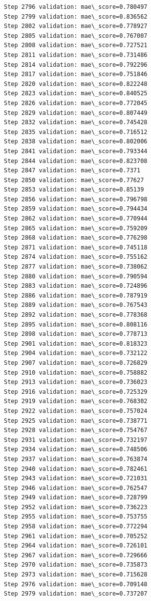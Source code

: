 \documentclass[11pt]{article}
\begin{document}
\begin{Verbatim}[commandchars=\\\{\}]
Step 2796 validation: mae\_score=0.780497
Step 2799 validation: mae\_score=0.836562
Step 2802 validation: mae\_score=0.778927
Step 2805 validation: mae\_score=0.767007
Step 2808 validation: mae\_score=0.727521
Step 2811 validation: mae\_score=0.731486
Step 2814 validation: mae\_score=0.792296
Step 2817 validation: mae\_score=0.751846
Step 2820 validation: mae\_score=0.822248
Step 2823 validation: mae\_score=0.840525
Step 2826 validation: mae\_score=0.772045
Step 2829 validation: mae\_score=0.807449
Step 2832 validation: mae\_score=0.745428
Step 2835 validation: mae\_score=0.716512
Step 2838 validation: mae\_score=0.802006
Step 2841 validation: mae\_score=0.793344
Step 2844 validation: mae\_score=0.823708
Step 2847 validation: mae\_score=0.7371
Step 2850 validation: mae\_score=0.77627
Step 2853 validation: mae\_score=0.85139
Step 2856 validation: mae\_score=0.796798
Step 2859 validation: mae\_score=0.794434
Step 2862 validation: mae\_score=0.770944
Step 2865 validation: mae\_score=0.759209
Step 2868 validation: mae\_score=0.776298
Step 2871 validation: mae\_score=0.745118
Step 2874 validation: mae\_score=0.755162
Step 2877 validation: mae\_score=0.738062
Step 2880 validation: mae\_score=0.790594
Step 2883 validation: mae\_score=0.724896
Step 2886 validation: mae\_score=0.787919
Step 2889 validation: mae\_score=0.767543
Step 2892 validation: mae\_score=0.778368
Step 2895 validation: mae\_score=0.808116
Step 2898 validation: mae\_score=0.778713
Step 2901 validation: mae\_score=0.818323
Step 2904 validation: mae\_score=0.732122
Step 2907 validation: mae\_score=0.726829
Step 2910 validation: mae\_score=0.758882
Step 2913 validation: mae\_score=0.736023
Step 2916 validation: mae\_score=0.725329
Step 2919 validation: mae\_score=0.768302
Step 2922 validation: mae\_score=0.757024
Step 2925 validation: mae\_score=0.738771
Step 2928 validation: mae\_score=0.754767
Step 2931 validation: mae\_score=0.732197
Step 2934 validation: mae\_score=0.748506
Step 2937 validation: mae\_score=0.763874
Step 2940 validation: mae\_score=0.782461
Step 2943 validation: mae\_score=0.721031
Step 2946 validation: mae\_score=0.762547
Step 2949 validation: mae\_score=0.728799
Step 2952 validation: mae\_score=0.736223
Step 2955 validation: mae\_score=0.753755
Step 2958 validation: mae\_score=0.772294
Step 2961 validation: mae\_score=0.705252
Step 2964 validation: mae\_score=0.726101
Step 2967 validation: mae\_score=0.729666
Step 2970 validation: mae\_score=0.735873
Step 2973 validation: mae\_score=0.715628
Step 2976 validation: mae\_score=0.709148
Step 2979 validation: mae\_score=0.737207

\end{Verbatim}
\end{document}
